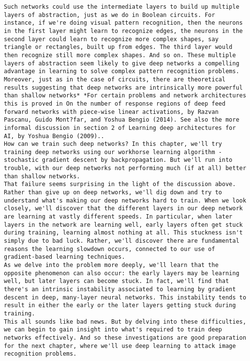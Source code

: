 \begin{lstlisting}
Such networks could use the intermediate layers to build up multiple layers of abstraction, just as we do in Boolean circuits. For instance, if we're doing visual pattern recognition, then the neurons in the first layer might learn to recognize edges, the neurons in the second layer could learn to recognize more complex shapes, say triangle or rectangles, built up from edges. The third layer would then recognize still more complex shapes. And so on. These multiple layers of abstraction seem likely to give deep networks a compelling advantage in learning to solve complex pattern recognition problems. Moreover, just as in the case of circuits, there are theoretical results suggesting that deep networks are intrinsically more powerful than shallow networks* *For certain problems and network architectures this is proved in On the number of response regions of deep feed forward networks with piece-wise linear activations, by Razvan Pascanu, Guido Mont?far, and Yoshua Bengio (2014). See also the more informal discussion in section 2 of Learning deep architectures for AI, by Yoshua Bengio (2009)..
How can we train such deep networks? In this chapter, we'll try training deep networks using our workhorse learning algorithm - stochastic gradient descent by backpropagation. But we'll run into trouble, with our deep networks not performing much (if at all) better than shallow networks.
That failure seems surprising in the light of the discussion above. Rather than give up on deep networks, we'll dig down and try to understand what's making our deep networks hard to train. When we look closely, we'll discover that the different layers in our deep network are learning at vastly different speeds. In particular, when later layers in the network are learning well, early layers often get stuck during training, learning almost nothing at all. This stuckness isn't simply due to bad luck. Rather, we'll discover there are fundamental reasons the learning slowdown occurs, connected to our use of gradient-based learning techniques.
As we delve into the problem more deeply, we'll learn that the opposite phenomenon can also occur: the early layers may be learning well, but later layers can become stuck. In fact, we'll find that there's an intrinsic instability associated to learning by gradient descent in deep, many-layer neural networks. This instability tends to result in either the early or the later layers getting stuck during training.
This all sounds like bad news. But by delving into these difficulties, we can begin to gain insight into what's required to train deep networks effectively. And so these investigations are good preparation for the next chapter, where we'll use deep learning to attack image recognition problems.

\end{lstlisting}
